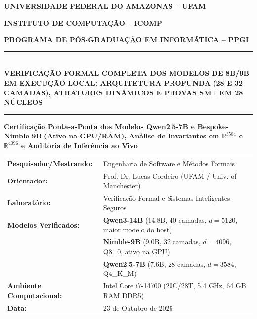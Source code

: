 \documentclass[11pt,a4paper]{article}
\theoremstyle{definition}
\begin{document}
\begin{titlepage}
    \thispagestyle{empty}
    \centering
    {\large\textbf{UNIVERSIDADE FEDERAL DO AMAZONAS -- UFAM}\par}
    {\large\textbf{INSTITUTO DE COMPUTAÇÃO -- ICOMP}\par}
    {\large\textbf{PROGRAMA DE PÓS-GRADUAÇÃO EM INFORMÁTICA -- PPGI}\par}
    \vspace{0.4cm}
    \rule{\linewidth}{1.2pt}\\[0.3cm]
    {\Large \bfseries \color{ufamblue} VERIFICAÇÃO FORMAL COMPLETA DOS MODELOS DE 8B/9B EM EXECUÇÃO LOCAL: ARQUITETURA PROFUNDA (28 E 32 CAMADAS), ATRATORES DINÂMICOS E PROVAS SMT EM 28 NÚCLEOS}\\[0.3cm]
    \rule{\linewidth}{1.2pt}
    
    \vspace{0.3cm}
    {\normalsize \textbf{Certificação Ponta-a-Ponta dos Modelos Qwen2.5-7B e Bespoke-Nimble-9B (Ativo na GPU/RAM), Análise de Invariantes em $\mathbb{R}^{3584}$ e $\mathbb{R}^{4096}$ e Auditoria de Inferência ao Vivo}\par}
    
    \vspace{0.5cm}
    \begin{minipage}{0.96\textwidth}
        \small
        \begin{tabularx}{\linewidth}{l X}
            \textbf{Pesquisador/Mestrando:} & Engenharia de Software e Métodos Formais \\
            \textbf{Orientador:} & Prof. Dr. Lucas Cordeiro (UFAM / Univ. of Manchester) \\
            \textbf{Laboratório:} & Verificação Formal e Sistemas Inteligentes Seguros \\
            \textbf{Modelos Verificados:} & \textbf{Qwen3-14B} (14.8B, 40 camadas, $d=5120$, maior modelo do host) \\
            & \textbf{Nimble-9B} (9.0B, 32 camadas, $d=4096$, Q8\_0, ativo na GPU) \\
            & \textbf{Qwen2.5-7B} (7.6B, 28 camadas, $d=3584$, Q4\_K\_M) \\
            \textbf{Ambiente Computacional:} & Intel Core i7-14700 (20C/28T, 5.4 GHz, 64 GB RAM DDR5) \\
            \textbf{Data:} & 23 de Outubro de 2026
        \end{tabularx}
    \end{minipage}
    

\end{titlepage}
\end{document}
